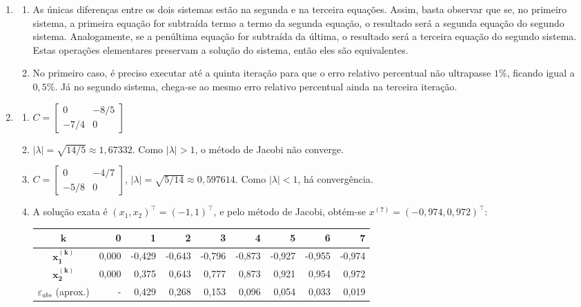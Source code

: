 \documentclass[12pt,a4paper]{article}
\begin{document}
\begin{enumerate}
\item \begin{enumerate}
\item As únicas diferenças entre os dois sistemas estão na segunda e na terceira equações. Assim, basta observar que se, no primeiro sistema, a primeira equação for subtraída termo a termo da segunda equação, o resultado será a segunda equação do segundo sistema. Analogamente, se a penúltima equação for subtraída da última, o resultado será a terceira equação do segundo sistema. Estas operações elementares preservam a solução do sistema, então eles são equivalentes.
\item No primeiro caso, é preciso executar até a quinta iteração para que o erro relativo percentual não ultrapasse $1\%$, ficando igual a $0,5\%$. Já no segundo sistema, chega-se ao mesmo erro relativo percentual ainda na terceira iteração.
\end{enumerate}
\item \begin{enumerate}
\item $C =
\begin{bmatrix}
0 & -8/5 \\
-7/4 & 0
\end{bmatrix}$
\item $|\lambda| = \sqrt{14/5}\approx 1,\!67332$. Como $|\lambda| > 1$, o método de Jacobi não converge.
\item $C =
\begin{bmatrix}
0 & -4/7 \\
-5/8 & 0
\end{bmatrix}$, $|\lambda| = \sqrt{5/14}\approx 0,\!597614$. Como $|\lambda| < 1$, há convergência.
\item A solução exata é $(x_1, x_2)^\intercal = (-1, 1)^\intercal$, e pelo método de Jacobi, obtém-se $x^{(7)} = (-0,974, 0,972)^\intercal$:
\medskip
\begin{center}
\begin{tabular}{crrrrrrrr}
\hline
$\boldsymbol{k}$     & 0 & 1 & 2 & 3 & 4 & 5 & 6 & 7 \\
\hline
$\boldsymbol{x_1^{(k)}}$ & 0,000 & -0,429 & -0,643 & -0,796 & -0,873 & -0,927 & -0,955 & -0,974 \\
$\boldsymbol{x_2^{(k)}}$ & 0,000 & 0,375 & 0,643 & 0,777 & 0,873 & 0,921 & 0,954 & 0,972 \\
\hline
$\varepsilon_{abs}$ (aprox.) & - & 0,429 & 0,268 & 0,153 & 0,096 & 0,054 & 0,033 & 0,019 \\
\hline
\end{tabular}
\end{center}
\end{enumerate}


\end{enumerate}
\end{document}
